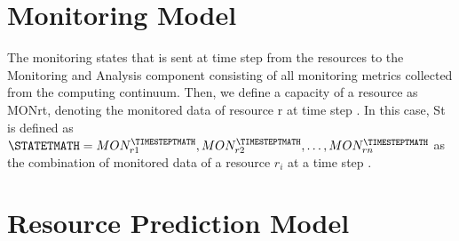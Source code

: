 




    \section{Monitoring Model}
    \label{sec:monitoring-model}

        The monitoring states \STATET that is sent at time step \TIMESTEPT from the resources to the Monitoring and Analysis component consisting of all monitoring metrics collected from the computing continuum. 
        Then, we define a capacity of a resource as MONrt, denoting the monitored data of resource r at time step \TIMESTEPT. 
        In this case, St is defined as $\STATETMATH = {MON_{r1}^\TIMESTEPTMATH, MON_{r2}^\TIMESTEPTMATH, \dots, MON_{rn}^\TIMESTEPTMATH}$ as the combination of monitored data of a resource $r_i$ at a time step \TIMESTEPT.

    \section{Resource Prediction Model}
    \label{sec:resource-prediction-model}

